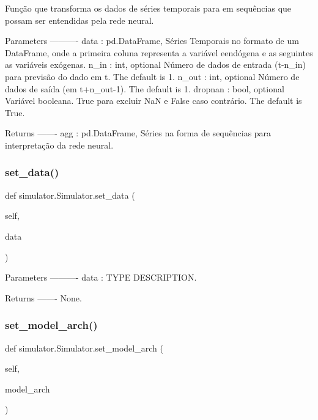 \begin{DoxyVerb}Função que transforma os dados de séries temporais para em sequências 
que possam ser entendidas pela rede neural. 

Parameters
----------
data : pd.DataFrame,
    Séries Temporais no formato de um DataFrame, onde a primeira coluna
    representa a variável eendógena e as seguintes as variáveis exógenas.
n_in : int, optional
    Número de dados de entrada (t-n_in) para previsão do dado em t. The default is 1.
n_out : int, optional
    Número de dados de saída (em t+n_out-1). The default is 1.
dropnan : bool, optional
    Variável booleana. True para excluir NaN e False caso contrário. The default is True.

Returns
-------
agg : pd.DataFrame,
    Séries na forma de sequências para interpretação da rede neural.\end{DoxyVerb}
 \mbox{\label{classsimulator_1_1Simulator_a10aa1b00ed1ca52092b6d9c981260504}} 
\subsubsection{\texorpdfstring{set\+\_\+data()}{set\_data()}}
{\footnotesize\ttfamily def simulator.\+Simulator.\+set\+\_\+data (\begin{DoxyParamCaption}\item[{}]{self,  }\item[{}]{data }\end{DoxyParamCaption})}

\begin{DoxyVerb}Parameters
----------
data : TYPE
    DESCRIPTION.

Returns
-------
None.\end{DoxyVerb}
 \mbox{\label{classsimulator_1_1Simulator_aacf67f1375064e16a9384b5716b95e56}} 
\subsubsection{\texorpdfstring{set\+\_\+model\+\_\+arch()}{set\_model\_arch()}}
{\footnotesize\ttfamily def simulator.\+Simulator.\+set\+\_\+model\+\_\+arch (\begin{DoxyParamCaption}\item[{}]{self,  }\item[{}]{model\+\_\+arch }\end{DoxyParamCaption})}

